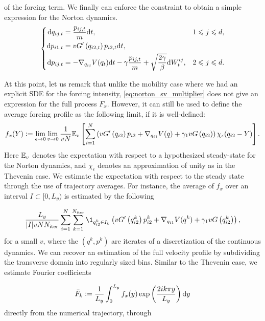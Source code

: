 of the forcing term. We finally can enforce the constraint to obtain a simple expression for the Norton dynamics.
\begin{equation}
    \label{eq:norton_sv_dynamics}
    \left\{\begin{aligned}
        \mathrm{d} q_{ij,t}&=\frac{p_{ij,t}}m\mathrm{d} t,&1\leqslant j\leqslant d,\\
        \mathrm{d} p_{i1,t}&=vG'\left(q_{i2,t}\right)p_{i2,t}\mathrm{d} t,&\\
        \mathrm{d} p_{ij,t}&=-\nabla_{q_{ij}}V(q_t)\mathrm{d} t-\gamma \frac{p_{ij,t}}m+\sqrt{\frac{2\gamma}\beta}\mathrm{d} W_t^{ij},&2\leqslant j\leqslant d.
    \end{aligned}\right.
\end{equation}

At this point, let us remark that unlike the mobility case where we had an explicit SDE for the forcing intensity, \eqref{eq:norton_sv_multiplier} does not give an expression for the full process $F_x$.
However, it can still be used to define the average forcing profile as the following limit, if it is well-defined:
\begin{equation}
    \label{eq:fx_definition}
    f_x(Y)\mathrel{\mathop:}= \underset{\epsilon \to 0}{\lim} \, \underset{v \to 0}{\lim}\, \frac{1}{vN}\mathbb{E}_v\left[\sum_{i=1}^N \left(vG'\left(q_{i2}\right)p_{i2}+\nabla_{q_{i1}}V(q)+\gamma_1vG\left(q_{i2}\right)\right)\chi_\epsilon(q_{i2}-Y)\right].
\end{equation}
Here $\mathbb{E}_v$ denotes the expectation with respect to a hypothesized steady-state for the Norton dynamics, and  $\chi_\epsilon$ denotes an approximation of unity as in the Thevenin case.
We estimate the expectation with respect to the steady state through the use of trajectory averages. For instance, the average of $f_x$ over an interval $I \subset [0,L_y)$ is estimated by the following

\begin{equation}
    \label{eq:norton_forcing_estimator}
    \frac{L_y}{|I|vN N_{\mathrm{iter}}}\sum_{i=1}^N\sum_{k=1}^{N_{\mathrm{iter}}}\1_{q_{i2}^k \in I_k}\left(vG'\left(q_{i2}^k\right)p_{i2}^k+\nabla_{q_{i1}}V(q^k)+\gamma_1vG\left(q_{i2}^k\right)\right),
\end{equation}
for a small $v$, where the $(q^k,p^k)$ are iterates of a discretization of the continuous dynamics.
We can recover an estimation of the full velocity profile by subdividing the transverse domain into regularly sized bins. Similar to the Thevenin case, we estimate Fourier coefficients 

\begin{equation}
    \label{eq:norton_fourier_coefficients}
    \bar F_k\mathrel{\mathop:}=\frac{1}{L_y}\int_0^{L_y}f_x(y)\exp\left(\frac{2ik\pi y}{L_y}\right)\mathrm{d} y
\end{equation}
directly from the numerical trajectory, through

